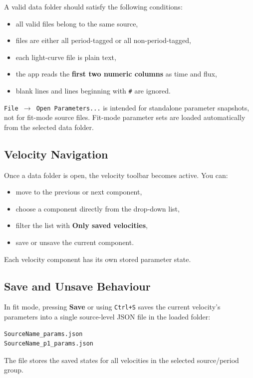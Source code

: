 \documentclass[12pt,a4paper]{article}
\newcommand{\menu}[1]{\texttt{#1}}
\newcommand{\key}[1]{\texttt{#1}}
\begin{document}
A valid data folder should satisfy the following conditions:
\begin{itemize}[noitemsep]
  \item all valid files belong to the same source,
  \item files are either all period-tagged or all non-period-tagged,
  \item each light-curve file is plain text,
  \item the app reads the \textbf{first two numeric columns} as time and flux,
  \item blank lines and lines beginning with \texttt{\#} are ignored.
\end{itemize}

\begin{warnbox}
\menu{File $\to$ Open Parameters...} is intended for standalone parameter snapshots, not for fit-mode source files.
Fit-mode parameter sets are loaded automatically from the selected data folder.
\end{warnbox}

\subsection{Velocity Navigation}

Once a data folder is open, the velocity toolbar becomes active.
You can:
\begin{itemize}[noitemsep]
  \item move to the previous or next component,
  \item choose a component directly from the drop-down list,
  \item filter the list with \textbf{Only saved velocities},
  \item save or unsave the current component.
\end{itemize}

Each velocity component has its own stored parameter state.

\subsection{Save and Unsave Behaviour}

In fit mode, pressing \textbf{Save} or using \key{Ctrl+S} saves the current velocity's parameters into a
single source-level JSON file in the loaded folder:
\begin{verbatim}
SourceName_params.json
SourceName_p1_params.json
\end{verbatim}
The file stores the saved states for all velocities in the selected source/period group.
\end{document}
